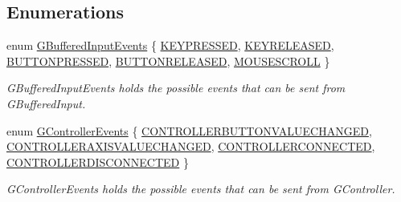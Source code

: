 \subsection*{Enumerations}
\begin{DoxyCompactItemize}
\item 
enum \mbox{\hyperlink{namespaceGW_1_1SYSTEM_a309fd3a92512dd2bfa8065d99c0d7fcb}{G\+Buffered\+Input\+Events}} \{ \newline
\mbox{\hyperlink{namespaceGW_1_1SYSTEM_a309fd3a92512dd2bfa8065d99c0d7fcbaf8bb58b0791c2d5d33b224213327f960}{K\+E\+Y\+P\+R\+E\+S\+S\+ED}}, 
\mbox{\hyperlink{namespaceGW_1_1SYSTEM_a309fd3a92512dd2bfa8065d99c0d7fcbabb708a216e7e8ef33cc542e6def7a688}{K\+E\+Y\+R\+E\+L\+E\+A\+S\+ED}}, 
\mbox{\hyperlink{namespaceGW_1_1SYSTEM_a309fd3a92512dd2bfa8065d99c0d7fcba56314f1a5b4d09751ed354a45a3a78fb}{B\+U\+T\+T\+O\+N\+P\+R\+E\+S\+S\+ED}}, 
\mbox{\hyperlink{namespaceGW_1_1SYSTEM_a309fd3a92512dd2bfa8065d99c0d7fcba9f7d6e613de276b27e471cd30eac08de}{B\+U\+T\+T\+O\+N\+R\+E\+L\+E\+A\+S\+ED}}, 
\newline
\mbox{\hyperlink{namespaceGW_1_1SYSTEM_a309fd3a92512dd2bfa8065d99c0d7fcbae4066728a571d6456cf5def5742a92bf}{M\+O\+U\+S\+E\+S\+C\+R\+O\+LL}}
 \}
\begin{DoxyCompactList}\small\item\em G\+Buffered\+Input\+Events holds the possible events that can be sent from G\+Buffered\+Input. \end{DoxyCompactList}\item 
enum \mbox{\hyperlink{namespaceGW_1_1SYSTEM_a90b22b31302f4172043122adfa8e49d7}{G\+Controller\+Events}} \{ \mbox{\hyperlink{namespaceGW_1_1SYSTEM_a90b22b31302f4172043122adfa8e49d7aa57b1c382c899e2a72f0691284971e93}{C\+O\+N\+T\+R\+O\+L\+L\+E\+R\+B\+U\+T\+T\+O\+N\+V\+A\+L\+U\+E\+C\+H\+A\+N\+G\+ED}}, 
\mbox{\hyperlink{namespaceGW_1_1SYSTEM_a90b22b31302f4172043122adfa8e49d7a9d30e7d5901b3b0619caf4c027f2cb15}{C\+O\+N\+T\+R\+O\+L\+L\+E\+R\+A\+X\+I\+S\+V\+A\+L\+U\+E\+C\+H\+A\+N\+G\+ED}}, 
\mbox{\hyperlink{namespaceGW_1_1SYSTEM_a90b22b31302f4172043122adfa8e49d7a797da82d4139f6f9ba5ce660389934f7}{C\+O\+N\+T\+R\+O\+L\+L\+E\+R\+C\+O\+N\+N\+E\+C\+T\+ED}}, 
\mbox{\hyperlink{namespaceGW_1_1SYSTEM_a90b22b31302f4172043122adfa8e49d7a6e7765910e63d5babc83ee42acb46eb3}{C\+O\+N\+T\+R\+O\+L\+L\+E\+R\+D\+I\+S\+C\+O\+N\+N\+E\+C\+T\+ED}}
 \}
\begin{DoxyCompactList}\small\item\em G\+Controller\+Events holds the possible events that can be sent from G\+Controller. \end{DoxyCompactList}\item 

\end{DoxyCompactItemize}
